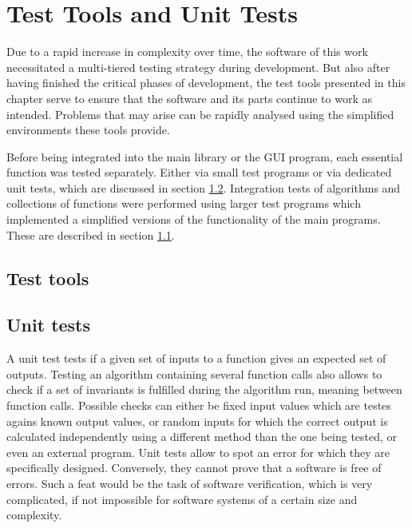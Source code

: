 %
%

\chapter{Test Tools and Unit Tests}
\label{ch:tests}
Due to a rapid increase in complexity over time, the software of this work 
necessitated a multi-tiered testing strategy during development.
But also after having finished the critical phases of development, the test tools presented in this 
chapter serve to ensure that the software and its parts continue to work as intended. 
Problems that may arise can be rapidly analysed using the simplified environments these tools provide.

Before being integrated into the main library or the GUI program, each essential function was tested 
separately. Either via small test programs or via dedicated unit tests, which are discussed in 
section \ref{sec:unit_tests}.
Integration tests of algorithms and collections of functions were performed using larger test programs 
which implemented a simplified versions of the functionality of the main programs.
These are described in section \ref{sec:tests_tools}.



\section{Test tools}
\label{sec:tests_tools}




\section{Unit tests}
\label{sec:unit_tests}
A unit test tests if a given set of inputs to a function gives an expected set of outputs.
Testing an algorithm containing several function calls also allows to check if a set of invariants
is fulfilled during the algorithm run, meaning between function calls.
Possible checks can either be fixed input values which are testes agains known output values,
or random inputs for which the correct output is calculated independently using a different 
method than the one being tested, or even an external program.
Unit tests allow to spot an error for which they are specifically designed. Conversely, they cannot 
prove that a software is free of errors. Such a feat would be the task of software verification, 
which is very complicated, if not impossible for software systems of a certain size and complexity.

